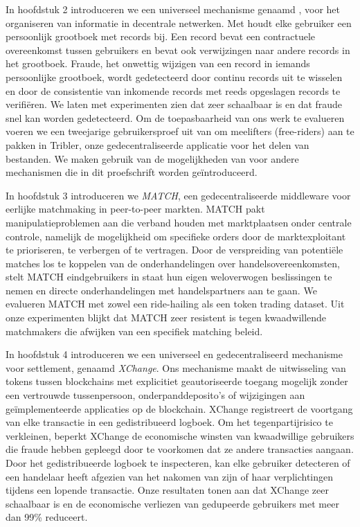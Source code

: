 {In hoofdstuk 2 introduceren we een universeel mechanisme genaamd \emph{\TrustChain{}}, voor het organiseren van informatie in decentrale netwerken.
Met \TrustChain{} houdt elke gebruiker een persoonlijk grootboek met records bij.
Een record bevat een contractuele overeenkomst tussen gebruikers en bevat ook verwijzingen naar andere records in het grootboek.
Fraude, het onwettig wijzigen van een record in iemands persoonlijke grootboek, wordt gedetecteerd door continu records uit te wisselen en door de consistentie van inkomende records met reeds opgeslagen records te verifiëren.
We laten met experimenten zien dat \TrustChain{} zeer schaalbaar is en dat fraude snel kan worden gedetecteerd.
Om de toepasbaarheid van ons werk te evalueren voeren we een tweejarige gebruikersproef uit van \TrustChain{} om meelifters (free-riders) aan te pakken in Tribler, onze gedecentraliseerde applicatie voor het delen van bestanden.
We maken gebruik van de mogelijkheden van \TrustChain{} voor andere mechanismen die in dit proefschrift worden geïntroduceerd.

In hoofdstuk 3 introduceren we \emph{MATCH}, een gedecentraliseerde middleware voor eerlijke matchmaking in peer-to-peer markten.
MATCH pakt manipulatieproblemen aan die verband houden met marktplaatsen onder centrale controle, namelijk de mogelijkheid om specifieke orders door de marktexploitant te prioriseren, te verbergen of te vertragen.
Door de verspreiding van potentiële matches los te koppelen van de onderhandelingen over handelsovereenkomsten, stelt MATCH eindgebruikers in staat hun eigen weloverwogen beslissingen te nemen en directe onderhandelingen met handelspartners aan te gaan.
We evalueren MATCH met zowel een ride-hailing als een token trading dataset.
Uit onze experimenten blijkt dat MATCH zeer resistent is tegen kwaadwillende matchmakers die afwijken van een specifiek matching beleid.

In hoofdstuk 4 introduceren we een universeel en gedecentraliseerd mechanisme voor settlement, genaamd \emph{XChange}.
Ons mechanisme maakt de uitwisseling van tokens tussen blockchains met explicitiet geautoriseerde toegang mogelijk zonder een vertrouwde tussenpersoon, onderpanddeposito's of wijzigingen aan geïmplementeerde applicaties op de blockchain.
XChange registreert de voortgang van elke transactie in een gedistribueerd logboek.
Om het tegenpartijrisico te verkleinen, beperkt XChange de economische winsten van kwaadwillige gebruikers die fraude hebben gepleegd door te voorkomen dat ze andere transacties aangaan.
Door het gedistribueerde logboek te inspecteren, kan elke gebruiker detecteren of een handelaar heeft afgezien van het nakomen van zijn of haar verplichtingen tijdens een lopende transactie.
Onze resultaten tonen aan dat XChange zeer schaalbaar is en de economische verliezen van gedupeerde gebruikers met meer dan 99\% reduceert.

}
